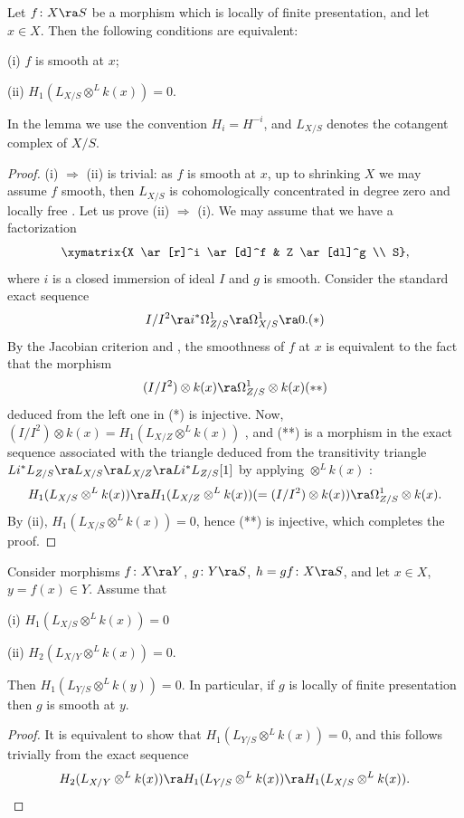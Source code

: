 \documentclass[10pt]{../fichiers-configuration-latex/smfart}
\begin{document}
\begin{lemma2}\label{8-invarlem1} Let $f{\colon} X \ra S$ be a
morphism which is locally of finite presentation, and let $x \in
X$. Then the following conditions are equivalent:

(i) $f$ is smooth at $x$;

(ii) $H_1(L_{X/S} \otimes^L k(x)) = 0$.  \end{lemma2} In the lemma
we use the convention $H_i = H^{-i}$, and $L_{X/S}$ denotes the
cotangent complex of $X/S$.  \begin{proof} (i) $\Rightarrow$
(ii) is trivial: as $f$ is smooth at $x$, up to shrinking $X$
we may assume $f$ smooth, then $L_{X/S}$ is cohomologically
concentrated in degree zero and locally free \cite[III
3.1.2]{Illusie@cotangent}. Let us prove (ii) $\Rightarrow$ (i).
We may assume that we have a factorization $$ \xymatrix{X \ar[r]^i
\ar[d]^f & Z \ar[dl]^g \\ S}, $$ where $i$ is a closed immersion of
ideal $I$ and $g$ is smooth. Consider the standard exact sequence
$$ I/I^2 \ra i^*\Omega^1_{Z/S} \ra \Omega^1_{X/S} \ra 0. \leqno
(*) $$ By the Jacobian criterion  and
, the smoothness of $f$ at $x$
is equivalent to the fact that the morphism $$ (I/I^2) \otimes k(x)
\ra \Omega^1_{Z/S} \otimes k(x) \leqno (**) $$ deduced from the left
one in (*) is injective.  Now, $(I/I^2) \otimes k(x) = H_1(L_{X/Z}
\otimes^L k(x))$ \cite[III 3.1.3]{Illusie@cotangent}, and (**)
is a morphism in the exact sequence associated with the triangle
deduced from the transitivity triangle $Li^*L_{Z/S} \ra L_{X/S}
\ra L_{X/Z} \ra Li^*L_{Z/S}[1]$ by applying $\otimes^L k(x)$ :
$$ H_1(L_{X/S} \otimes^L k(x)) \ra H_1(L_{X/Z} \otimes^L k(x))
(= (I/I^2) \otimes k(x)) \ra \Omega^1_{Z/S} \otimes k(x).  $$ By
(ii), $H_1(L_{X/S} \otimes^L k(x)) = 0$, hence (**) is injective,
which completes the proof.  \end{proof}

\begin{lemma2}\label{8-invarlem2} Consider morphisms $f{\colon}
X \ra Y$, $g{\colon} Y \ra S$, $h = gf{\colon} X \ra S$, and let
$x \in X$, $y=f(x)\in Y$. Assume that

(i) $H_1(L_{X/S} \otimes ^L k(x)) = 0$

(ii) $H_2(L_{X/Y} \otimes^L k(x)) = 0$.

Then $H_1(L_{Y/S} \otimes^L k(y)) = 0$. In particular, if $g$
is locally of finite presentation then $g$ is smooth at $y$.
\end{lemma2} \begin{proof}It is equivalent to show that $H_1(L_{Y/S}
\otimes^L k(x)) = 0$, and this follows trivially from the exact
sequence $$ H_2(L_{X/Y} \otimes^L k(x)) \ra H_1(L_{Y/S} \otimes^L
k(x)) \ra H_1(L_{X/S} \otimes^L k(x)).  $$ \end{proof}
\end{document}

